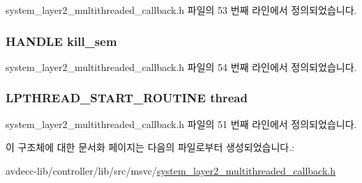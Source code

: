 system\+\_\+layer2\+\_\+multithreaded\+\_\+callback.\+h 파일의 53 번째 라인에서 정의되었습니다.

\subsubsection[{\texorpdfstring{kill\+\_\+sem}{kill_sem}}]{\setlength{\rightskip}{0pt plus 5cm}H\+A\+N\+D\+LE kill\+\_\+sem}\hypertarget{structavdecc__lib_1_1system__layer2__multithreaded__callback_1_1thread__creation_a8938321e37bc0147ed95ffd6aee8c099}{}\label{structavdecc__lib_1_1system__layer2__multithreaded__callback_1_1thread__creation_a8938321e37bc0147ed95ffd6aee8c099}


system\+\_\+layer2\+\_\+multithreaded\+\_\+callback.\+h 파일의 54 번째 라인에서 정의되었습니다.

\subsubsection[{\texorpdfstring{thread}{thread}}]{\setlength{\rightskip}{0pt plus 5cm}L\+P\+T\+H\+R\+E\+A\+D\+\_\+\+S\+T\+A\+R\+T\+\_\+\+R\+O\+U\+T\+I\+NE thread}\hypertarget{structavdecc__lib_1_1system__layer2__multithreaded__callback_1_1thread__creation_aa930d342e4c53bcc9bf4da7995c81a3b}{}\label{structavdecc__lib_1_1system__layer2__multithreaded__callback_1_1thread__creation_aa930d342e4c53bcc9bf4da7995c81a3b}


system\+\_\+layer2\+\_\+multithreaded\+\_\+callback.\+h 파일의 51 번째 라인에서 정의되었습니다.



이 구조체에 대한 문서화 페이지는 다음의 파일로부터 생성되었습니다.\+:\begin{DoxyCompactItemize}
\item 
avdecc-\/lib/controller/lib/src/msvc/\hyperlink{msvc_2system__layer2__multithreaded__callback_8h}{system\+\_\+layer2\+\_\+multithreaded\+\_\+callback.\+h}\end{DoxyCompactItemize}
